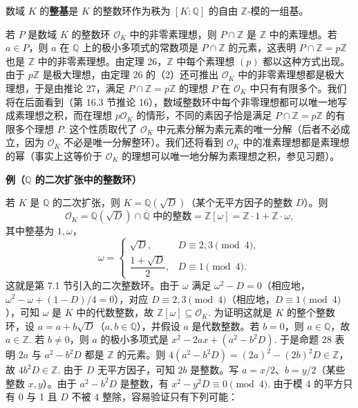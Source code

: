 \begin{definition}
数域 \(K\) 的\textbf{整基}是 \(K\) 的整数环作为秩为 \([K:\mathbb{Q}]\) 的自由 \(\mathbb{Z}\)-模的一组基。
\end{definition}

若 \(P\) 是数域 \(K\) 的整数环 \(\mathcal{O}_K\) 中的非零素理想，则 \(P \cap \mathbb{Z}\) 是 \(\mathbb{Z}\) 中的素理想。若 \(a \in P\)，则 \(a\) 在 \(\mathbb{Q}\) 上的极小多项式的常数项是 \(P \cap \mathbb{Z}\) 的元素，这表明 \(P \cap \mathbb{Z} = p\mathbb{Z}\) 也是 \(\mathbb{Z}\) 中的非零素理想。由定理 26，\(\mathbb{Z}\) 中每个素理想 \((p)\) 都以这种方式出现。由于 \(p\mathbb{Z}\) 是极大理想，由定理 26 的（2）还可推出 \(\mathcal{O}_K\) 中的非零素理想都是极大理想，于是由推论 27，满足 \(P \cap \mathbb{Z} = p\mathbb{Z}\) 的理想 \(P\) 在 \(\mathcal{O}_K\) 中只有有限多个。我们将在后面看到（第 16.3 节推论 16），数域整数环中每个非零理想都可以唯一地写成素理想之积，而在理想 \(p\mathcal{O}_K\) 的情形，不同的素因子恰是满足 \(P \cap \mathbb{Z} = p\mathbb{Z}\) 的有限多个理想 \(P\). 这个性质取代了 \(\mathcal{O}_K\) 中元素分解为素元素的唯一分解（后者不必成立，因为 \(\mathcal{O}_K\) 不必是唯一分解整环）。我们还将看到 \(\mathcal{O}_K\) 中的准素理想都是素理想的幂（事实上这等价于 \(\mathcal{O}_K\) 的理想可以唯一地分解为素理想之积，参见习题）。

\noindent\textbf{例（\(\mathbb{Q}\) 的二次扩张中的整数环）}

若 \(K\) 是 \(\mathbb{Q}\) 的二次扩张，则 \(K = \mathbb{Q}(\sqrt{D})\)（某个无平方因子的整数 \(D\)）。则
\[
\mathcal{O}_K = \mathbb{Q}(\sqrt{D}) \cap \overline{\mathbb{Q}} \text{ 中的整数} = \mathbb{Z}[\omega] = \mathbb{Z}\cdot 1+\mathbb{Z}\cdot\omega,
\]
其中整基为 \(1, \omega\)，
\[
\omega = \begin{cases} \sqrt{D}, & D \equiv 2, 3 \pmod 4,\\ \dfrac{1+\sqrt{D}}{2}, & D \equiv 1 \pmod 4. \end{cases}
\]
这就是第 7.1 节引入的二次整数环。由于 \(\omega\) 满足 \(\omega^2-D = 0\)（相应地，\(\omega^2-\omega+(1-D)/4 = 0\)），对应 \(D \equiv 2, 3 \pmod 4\)（相应地，\(D \equiv 1 \pmod 4\)），可知 \(\omega\) 是 \(K\) 中的代数整数，故 \(\mathbb{Z}[\omega] \subseteq \mathcal{O}_K\). 为证明这就是 \(K\) 的整个整数环，设 \(a = a+b\sqrt{D}\)（\(a, b \in \mathbb{Q}\)），并假设 \(a\) 是代数整数。若 \(b = 0\)，则 \(a \in \mathbb{Q}\)，故 \(a \in \mathbb{Z}\). 若 \(b \neq 0\)，则 \(a\) 的极小多项式是 \(x^2-2ax+(a^2-b^2D)\). 于是命题 28 表明 \(2a\) 与 \(a^2-b^2D\) 都是 \(\mathbb{Z}\) 的元素。则 \(4(a^2-b^2D) = (2a)^2-(2b)^2D \in \mathbb{Z}\)，故 \(4b^2D \in \mathbb{Z}\). 由于 \(D\) 无平方因子，可知 \(2b\) 是整数。写 \(a = x/2\)、\(b = y/2\)（某些整数 \(x, y\)）。由于 \(a^2-b^2D\) 是整数，有 \(x^2-y^2D \equiv 0 \pmod 4\). 由于模 4 的平方只有 0 与 1 且 \(D\) 不被 4 整除，容易验证只有下列可能：

